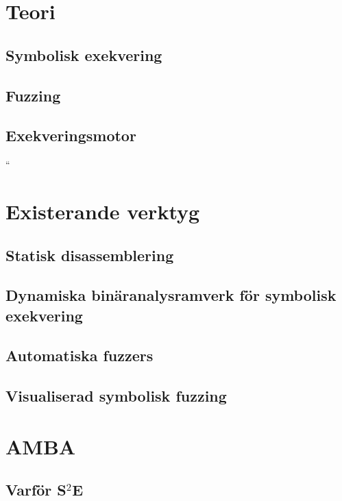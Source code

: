 \documentclass[12pt,a4paper,twoside,openright]{report}
\newcommand{\stoe}{S$^2$E\xspace}
\begin{document}
\chapter{Teori}\label{chap:teori}

\section{Symbolisk exekvering}\label{sec:symbolic_execution}

\section{Fuzzing}

\section{Exekveringsmotor}

``
\chapter{Existerande verktyg}\label{chap:existerande_verktyg}

\section{Statisk disassemblering}\label{sec:existerande-disasm}

\section{Dynamiska binäranalysramverk för symbolisk exekvering}\label{sec:existerande-ramverk}

\section{Automatiska fuzzers}\label{sec:existerande-automatisk}

\section{Visualiserad symbolisk fuzzing}\label{sec:existerande-visualiserad}


\chapter{AMBA}\label{chap:amba}

\section{Varför \stoe{}}

\end{document}
